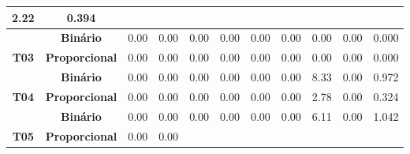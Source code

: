 \begin{table}[htbp]
\begin{tabular}{|c|cccccccccc|}
		\multicolumn{1}{c|}{\cellcolor[HTML]{F2F2F2}2.22} &
		\cellcolor[HTML]{F2F2F2}0.394 \\ \hline
		&
		\multicolumn{1}{c|}{\textbf{Binário}} &
		\multicolumn{1}{c|}{0.00} &
		\multicolumn{1}{c|}{0.00} &
		\multicolumn{1}{c|}{0.00} &
		\multicolumn{1}{c|}{0.00} &
		\multicolumn{1}{c|}{0.00} &
		\multicolumn{1}{c|}{0.00} &
		\multicolumn{1}{c|}{0.00} &
		\multicolumn{1}{c|}{0.00} &
		0.000 \\ \cline{2-11} 
		\multirow{-2}{*}{\textbf{T03}} &
		\multicolumn{1}{c|}{\cellcolor[HTML]{F2F2F2}\textbf{Proporcional}} &
		\multicolumn{1}{c|}{\cellcolor[HTML]{F2F2F2}0.00} &
		\multicolumn{1}{c|}{\cellcolor[HTML]{F2F2F2}0.00} &
		\multicolumn{1}{c|}{\cellcolor[HTML]{F2F2F2}0.00} &
		\multicolumn{1}{c|}{\cellcolor[HTML]{F2F2F2}0.00} &
		\multicolumn{1}{c|}{\cellcolor[HTML]{F2F2F2}0.00} &
		\multicolumn{1}{c|}{\cellcolor[HTML]{F2F2F2}0.00} &
		\multicolumn{1}{c|}{\cellcolor[HTML]{F2F2F2}0.00} &
		\multicolumn{1}{c|}{\cellcolor[HTML]{F2F2F2}0.00} &
		\cellcolor[HTML]{F2F2F2}0.000 \\ \hline
		&
		\multicolumn{1}{c|}{\textbf{Binário}} &
		\multicolumn{1}{c|}{0.00} &
		\multicolumn{1}{c|}{0.00} &
		\multicolumn{1}{c|}{0.00} &
		\multicolumn{1}{c|}{0.00} &
		\multicolumn{1}{c|}{0.00} &
		\multicolumn{1}{c|}{0.00} &
		\multicolumn{1}{c|}{8.33} &
		\multicolumn{1}{c|}{0.00} &
		0.972 \\ \cline{2-11} 
		\multirow{-2}{*}{\textbf{T04}} &
		\multicolumn{1}{c|}{\cellcolor[HTML]{F2F2F2}\textbf{Proporcional}} &
		\multicolumn{1}{c|}{\cellcolor[HTML]{F2F2F2}0.00} &
		\multicolumn{1}{c|}{\cellcolor[HTML]{F2F2F2}0.00} &
		\multicolumn{1}{c|}{\cellcolor[HTML]{F2F2F2}0.00} &
		\multicolumn{1}{c|}{\cellcolor[HTML]{F2F2F2}0.00} &
		\multicolumn{1}{c|}{\cellcolor[HTML]{F2F2F2}0.00} &
		\multicolumn{1}{c|}{\cellcolor[HTML]{F2F2F2}0.00} &
		\multicolumn{1}{c|}{\cellcolor[HTML]{F2F2F2}2.78} &
		\multicolumn{1}{c|}{\cellcolor[HTML]{F2F2F2}0.00} &
		\cellcolor[HTML]{F2F2F2}0.324 \\ \hline
		&
		\multicolumn{1}{c|}{\textbf{Binário}} &
		\multicolumn{1}{c|}{0.00} &
		\multicolumn{1}{c|}{0.00} &
		\multicolumn{1}{c|}{0.00} &
		\multicolumn{1}{c|}{0.00} &
		\multicolumn{1}{c|}{0.00} &
		\multicolumn{1}{c|}{0.00} &
		\multicolumn{1}{c|}{6.11} &
		\multicolumn{1}{c|}{0.00} &
		1.042 \\ \cline{2-11} 
		\multirow{-2}{*}{\textbf{T05}} &
		\multicolumn{1}{c|}{\cellcolor[HTML]{F2F2F2}\textbf{Proporcional}} &
		\multicolumn{1}{c|}{\cellcolor[HTML]{F2F2F2}0.00} &
		\multicolumn{1}{c|}{\cellcolor[HTML]{F2F2F2}0.00} &

\end{tabular}
\end{table}

